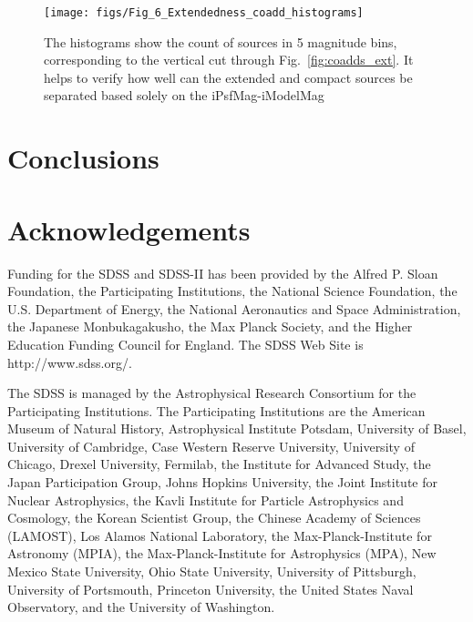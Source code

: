 \documentclass[fleqn,usenatbib]{mnras}  %
\begin{document}
\begin{figure*}
\label{fig:coadds_ext_hist}
 \texttt{[image: figs/Fig\_6\_Extendedness\_coadd\_histograms]}
 \caption{The histograms show the count of sources in 5 magnitude bins, corresponding to the vertical cut through Fig.~\ref{fig:coadds_ext}. It helps to verify how well can the extended and compact sources be separated based solely on the iPsfMag-iModelMag}
\end{figure*}






\section{Conclusions}
\label{sec:conclusions}



\section*{Acknowledgements}

Funding for the SDSS and SDSS-II has been provided by the Alfred P. Sloan Foundation, the Participating Institutions, the National Science Foundation, the U.S. Department of Energy, the National Aeronautics and Space Administration, the Japanese Monbukagakusho, the Max Planck Society, and the Higher Education Funding Council for England. The SDSS Web Site is http://www.sdss.org/.

The SDSS is managed by the Astrophysical Research Consortium for the Participating Institutions. The Participating Institutions are the American Museum of Natural History, Astrophysical Institute Potsdam, University of Basel, University of Cambridge, Case Western Reserve University, University of Chicago, Drexel University, Fermilab, the Institute for Advanced Study, the Japan Participation Group, Johns Hopkins University, the Joint Institute for Nuclear Astrophysics, the Kavli Institute for Particle Astrophysics and Cosmology, the Korean Scientist Group, the Chinese Academy of Sciences (LAMOST), Los Alamos National Laboratory, the Max-Planck-Institute for Astronomy (MPIA), the Max-Planck-Institute for Astrophysics (MPA), New Mexico State University, Ohio State University, University of Pittsburgh, University of Portsmouth, Princeton University, the United States Naval Observatory, and the University of Washington. 
\end{document}
